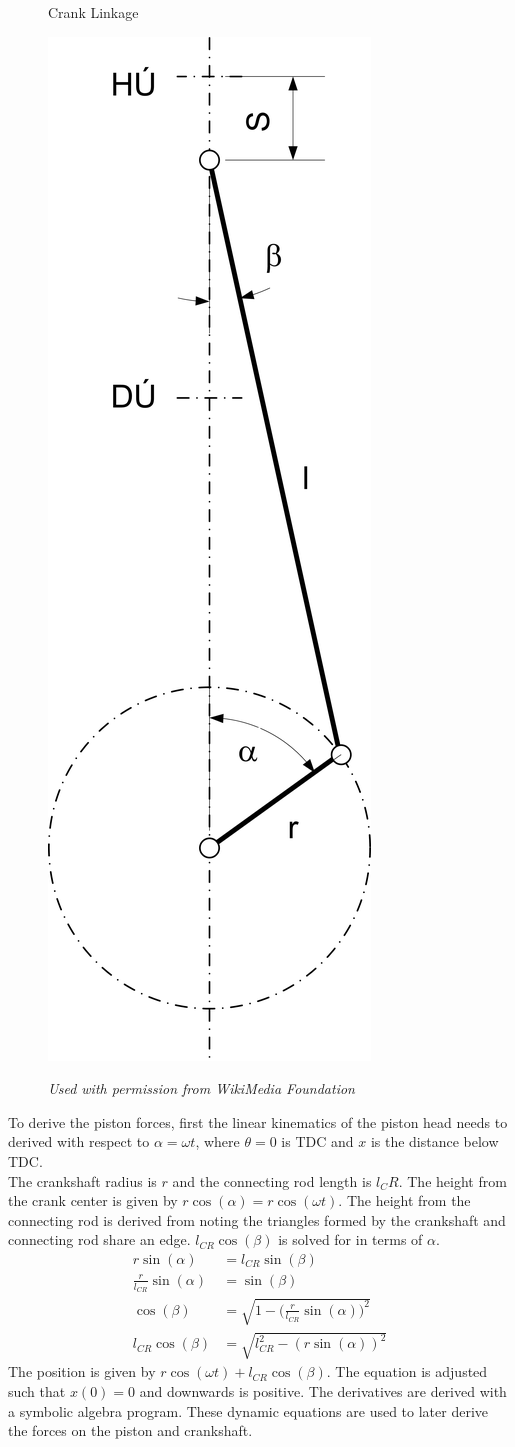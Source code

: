 \documentclass[10pt,a4paper]{article}
\begin{document}
	\begin{figure}
		\centering
		\caption*{Crank Linkage}
		\includegraphics[width=.17\textwidth]{CrankDiagram.png}
		\label{fig:diagram2}
		\caption*{{\tiny \textit{Used with permission from WikiMedia Foundation}}}
		
	\end{figure}
	To derive the piston forces, first the linear kinematics of the piston head needs to derived with respect to $\alpha = \omega t$, where $\theta = 0$ is TDC and $x$ is the distance below TDC. \\
	The crankshaft radius is $r$ and the connecting rod length is $l_CR$. The height from the crank center is given by $r \cos (\alpha) = r \cos (\omega t)$. The height from the connecting rod is derived from noting the triangles formed by the crankshaft and connecting rod share an edge. $l_{CR} \cos (\beta)$ is solved for in terms of $\alpha$.
	\begin{align}
		r \sin(\alpha) &= l_{CR} \sin (\beta)\\
		\frac{r}{l_{CR}}\sin(\alpha) &= \sin (\beta)\\
		\cos(\beta) &= \sqrt{1 - \Big( \frac{r}{l_{CR}}\sin(\alpha) \Big)^2}\\
		l_{CR} \cos (\beta) &= \sqrt{l_{CR}^2 - (r \sin (\alpha))^2}
	\end{align}
	The position is given by $r \cos (\omega t) + l_{CR} \cos (\beta)$. The equation is adjusted such that $x(0)=0$ and downwards is positive. The derivatives are derived with a symbolic algebra program. These dynamic equations are used to later derive the forces on the piston and crankshaft.\\
\end{document}
